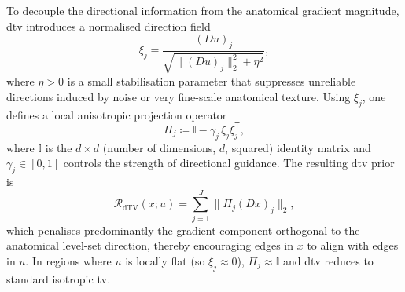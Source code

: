 To decouple the directional information from the anatomical gradient magnitude, \gls{dtv} \cite{ehrhardtPETReconstructionAnatomical2016} introduces a normalised direction field
\begin{equation}\label{eq:xi}
    \xi_j
    = \frac{(D u)_j}{\sqrt{\|(D u)_j\|_2^2 + \eta^2}},
\end{equation}
where $\eta>0$ is a small stabilisation parameter that  suppresses unreliable directions induced by noise or very fine-scale anatomical texture. Using $\xi_j$, one defines a local anisotropic projection operator
\begin{equation}\label{eq:directional_op}
    \Pi_j \coloneqq \mathbb{I} - \gamma_j\, \xi_j \xi_j^{\mathsf T},
\end{equation}
where $\mathbb{I}$ is the $d\times d$ (number of dimensions, $d$, squared) identity matrix and $\gamma_j\in[0,1]$ controls the strength of directional guidance. The resulting \gls{dtv} prior is
\begin{equation}\label{eq:dtv_defn}
    \mathcal{R}_{\mathrm{dTV}}(x;u)
    = \sum_{j=1}^J \| \Pi_j (D x)_j \|_2,
\end{equation}
which penalises predominantly the gradient component orthogonal to the anatomical level-set direction, thereby encouraging edges in $x$ to align with edges in $u$. In regions where $u$ is locally flat (so $\xi_j \approx 0$), $\Pi_j \approx \mathbb{I}$ and \gls{dtv} reduces to standard isotropic \gls{tv}.

